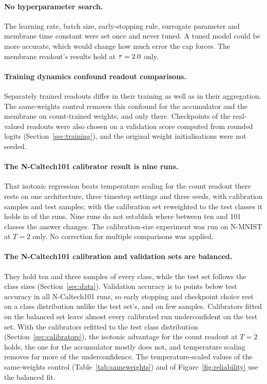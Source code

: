 \documentclass[10pt]{article}
\begin{document}
\paragraph{No hyperparameter search.} The learning rate, batch size, early-stopping rule,
surrogate parameter and membrane time constant were set once and never tuned. A tuned model could
be more accurate, which would change how much error the cap forces. The membrane readout's
results hold at $\tau=2.0$ only. %

\paragraph{Training dynamics confound readout comparisons.} Separately trained readouts differ in
their training as well as in their aggregation. The same-weights control removes this confound
for the accumulator and the membrane on count-trained weights, and only there. Checkpoints of the
real-valued readouts were also chosen on a validation score computed from rounded logits
(Section~\ref{sec:training}), and the original weight initialisations were not seeded.

\paragraph{The N-Caltech101 calibrator result is nine runs.} That isotonic regression beats
temperature scaling for the count readout there rests on one architecture, three timestep
settings and three seeds, with \ccCalSize{} calibration samples and \ccTestSize{} test samples; %
with the calibration set reweighted to the test classes it holds in \rwCountIso{} of the \rwCountRuns{} runs. %
Nine runs do not establish where between ten and 101 classes the answer changes. The calibration-size experiment was run on
N-MNIST at $T=2$ only. No correction for multiple comparisons was applied.

\paragraph{The N-Caltech101 calibration and validation sets are balanced.} They hold ten and three
samples of every class, while the test set follows the class sizes (Section~\ref{sec:data}).
Validation accuracy is \valGapNcMin{} to \valGapNcMax{} points below test accuracy in all %
\valGapNcRuns{} N-Caltech101 runs, so early stopping and checkpoint choice rest on a class
distribution unlike the test set's, and on few samples. Calibrators fitted on the balanced set
leave almost every calibrated run underconfident on the test set. With the calibrators refitted
to the test class distribution (Section~\ref{sec:calibrators}), the isotonic advantage for the count readout at
$T=2$ holds, the one for the accumulator mostly does not, and temperature scaling removes far more
of the underconfidence. The temperature-scaled values of the same-weights control
(Table~\ref{tab:sameweights}) and of Figure~\ref{fig:reliability} use the balanced fit.
\end{document}
